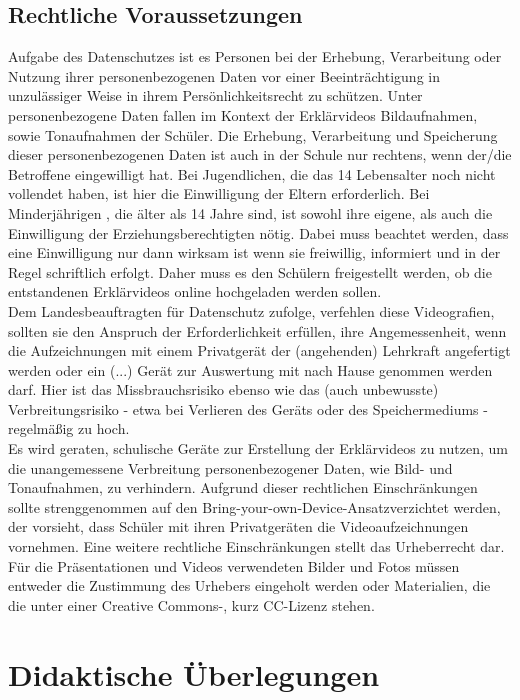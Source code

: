 \documentclass[a4paper,12pt,twoside=false]{scrartcl}
\begin{document}
\subsection{Rechtliche Voraussetzungen}\label{RechtlicheVoraussetzungen}
Aufgabe des Datenschutzes ist es Personen bei der Erhebung, Verarbeitung oder Nutzung ihrer personenbezogenen Daten vor einer Beeinträchtigung in unzulässiger Weise in ihrem Persönlichkeitsrecht zu schützen. Unter personenbezogene Daten fallen im Kontext der Erklärvideos Bildaufnahmen, sowie Tonaufnahmen der Schüler. Die Erhebung, Verarbeitung und Speicherung dieser personenbezogenen Daten ist auch in der Schule nur rechtens, wenn der/die Betroffene eingewilligt hat. Bei Jugendlichen, die das 14 Lebensalter noch nicht vollendet haben, ist hier die Einwilligung der Eltern erforderlich. Bei Minderjährigen , die älter als 14 Jahre sind, ist sowohl ihre eigene, als auch die Einwilligung der Erziehungsberechtigten nötig. Dabei muss beachtet werden, dass eine Einwilligung nur dann wirksam ist wenn sie freiwillig, informiert und in der Regel schriftlich erfolgt. Daher muss es den Schülern freigestellt werden, ob die entstandenen Erklärvideos online hochgeladen werden sollen. \\
Dem Landesbeauftragten für Datenschutz zufolge, verfehlen diese Videografien, sollten sie den Anspruch der Erforderlichkeit erfüllen, ihre Angemessenheit, wenn die \glqq Aufzeichnungen mit einem Privatgerät der (angehenden) Lehrkraft angefertigt werden oder ein (...) Gerät zur Auswertung mit nach Hause genommen werden darf. Hier ist das Missbrauchsrisiko ebenso wie das (auch unbewusste) Verbreitungsrisiko - etwa bei Verlieren des Geräts oder des Speichermediums - regelmäßig zu hoch.\grqq$~$ \cite{LBD} \\
Es wird geraten, schulische Geräte zur Erstellung der Erklärvideos zu nutzen, um die unangemessene Verbreitung personenbezogener Daten, wie Bild- und Tonaufnahmen, zu verhindern. Aufgrund dieser rechtlichen Einschränkungen sollte strenggenommen auf den \glqq Bring-your-own-Device-Ansatz\grqq verzichtet werden, der vorsieht, dass Schüler mit ihren Privatgeräten die Videoaufzeichnungen vornehmen.
Eine weitere rechtliche Einschränkungen stellt das Urheberrecht dar. Für die Präsentationen und Videos verwendeten Bilder und Fotos müssen entweder die Zustimmung des Urhebers eingeholt werden oder Materialien, die die unter einer Creative Commons-, kurz CC-Lizenz stehen.  

\section{Didaktische Überlegungen}
\end{document}
